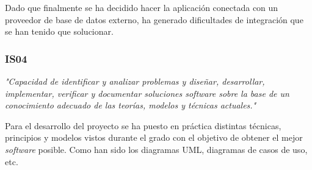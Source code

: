 \medskip
Dado que finalmente se ha decidido hacer la aplicación conectada con un proveedor de base de
datos externo, ha generado dificultades de integración que se han tenido que solucionar.

\subsubsection{IS04}
\textit{"Capacidad de identificar y analizar problemas y diseñar, desarrollar,
implementar, verificar y documentar soluciones software sobre la base de
un conocimiento adecuado de las teorías, modelos y técnicas actuales."}

\medskip
Para el desarrollo del proyecto se ha puesto en práctica distintas técnicas, principios y
modelos vistos durante el grado con el objetivo de obtener el mejor \textit{software} posible.
Como han sido los diagramas UML, diagramas de casos de uso, etc.